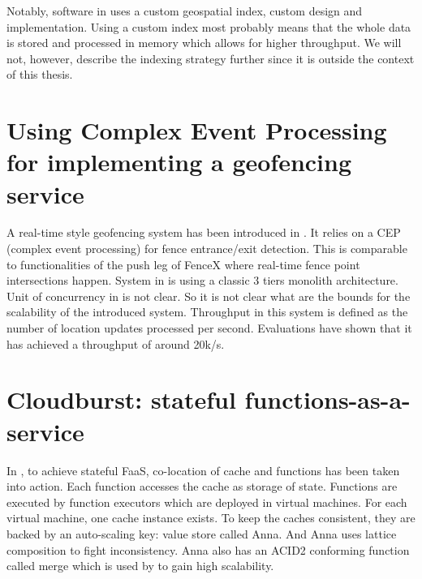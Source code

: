 \documentclass[a4]{report}
\begin{document}
    Notably, software in \cite{Cirillo-Jacobs-Martin-Szczytowski-2014} uses a custom geospatial index,
    custom design and implementation.
    Using a custom index most probably means that the whole data is stored and processed in memory which allows for
    higher throughput.
    We will not, however, describe the indexing strategy further since it is outside the context of this thesis.


    \section{Using Complex Event Processing for implementing a geofencing service}
    A real-time style geofencing system has been introduced in \cite{Nechifor_Comnac_2013}.
    It relies on a CEP (complex event processing) for fence entrance/exit detection.
    This is comparable to functionalities of the push leg of FenceX where real-time fence point intersections happen.
    System in \cite{Nechifor_Comnac_2013} is using a classic 3 tiers monolith architecture.
    Unit of concurrency in \cite{Nechifor_Comnac_2013} is not clear.
    So it is not clear what are the bounds for the scalability of the introduced system.
    Throughput in this system is defined as the number of location updates processed per second.
    Evaluations have shown that it has achieved a throughput of around 20k/s.


    \section{Cloudburst: stateful functions-as-a-service}
    In \cite{Functions-as-a-Service-2020}, to achieve stateful FaaS, co-location of cache and functions has been
    taken into action.
    Each function accesses the cache as storage of state.
    Functions are executed by function executors which are deployed in virtual machines.
    For each virtual machine, one cache instance exists.
    To keep the caches consistent, they are backed by an auto-scaling key: value store called Anna.
    And Anna uses lattice composition to fight inconsistency.
    Anna also has an ACID2 conforming function called merge which is used by \cite{Functions-as-a-Service-2020} to gain high scalability.
\end{document}
